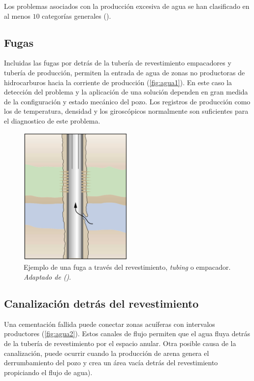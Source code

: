 Los problemas asociados con la producción excesiva de agua se han clasificado en al menos $10$ categorías generales (\cite{Bailey2000}).



\subsection{Fugas}
Incluidas las fugas por detrás de la tubería de revestimiento empacadores y tubería de producción, permiten la entrada de agua de zonas no productoras de hidrocarburos hacia la corriente de producción (\autoref{fig:agua1}). En este caso la detección del problema y la aplicación de una solución dependen en gran medida de la configuración y estado mecánico del pozo. Los registros de producción como los de temperatura, densidad y los giroscópicos normalmente son suficientes para el diagnostico de este problema.

\begin{figure}\centering
    \includegraphics[width=0.5\textwidth]{Graphics/agua1.png}
    \caption[Fugas dentro del pozo]{Ejemplo de una fuga a través del revestimiento, \emph{tubing} o empacador. \emph{Adaptado de (\cite{Bailey2000})}.}
    \label{fig:agua1}
\end{figure}

\subsection{Canalización detrás del revestimiento}
Una cementación fallida puede conectar zonas acuíferas con intervalos productores (\autoref{fig:agua2}). Estos canales de flujo permiten que el agua fluya detrás de la tubería de revestimiento por el espacio anular. Otra posible causa de la canalización, puede ocurrir cuando la producción de arena  genera el derrumbamiento del pozo y crea un área vacía detrás del revestimiento propiciando el flujo de agua).

